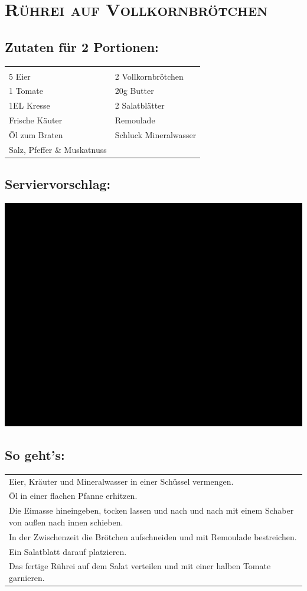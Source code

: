 \section{\textsc{Rührei auf Vollkornbrötchen}}

\subsection*{Zutaten für 2 Portionen:}

\begin{tabular}{p{7.5cm} p{7.5cm}}
	& \\
	5 Eier & 2 Vollkornbrötchen \\
	1 Tomate & 20g Butter \\
  1EL Kresse & 2 Salatblätter \\
  Frische Käuter & Remoulade \\
  Öl zum Braten & Schluck Mineralwasser \\
  Salz, Pfeffer \& Muskatnuss
\end{tabular}

\subsection*{Serviervorschlag:}

\includegraphics[width=\textwidth]{img/ph.jpg} \cite{ruehreivollkorn}

\subsection*{So geht's:}

\begin{tabular}{p{15cm}}
	\\
  Eier, Kräuter und Mineralwasser in einer Schüssel vermengen.\\
  Öl in einer flachen Pfanne erhitzen.\\
  Die Eimasse hineingeben, tocken lassen und nach und nach mit einem Schaber von außen nach innen schieben.\\
  In der Zwischenzeit die Brötchen aufschneiden und mit Remoulade bestreichen.\\
  Ein Salatblatt darauf platzieren.\\
  Das fertige Rührei auf dem Salat verteilen und mit einer halben Tomate garnieren.
\end{tabular}
